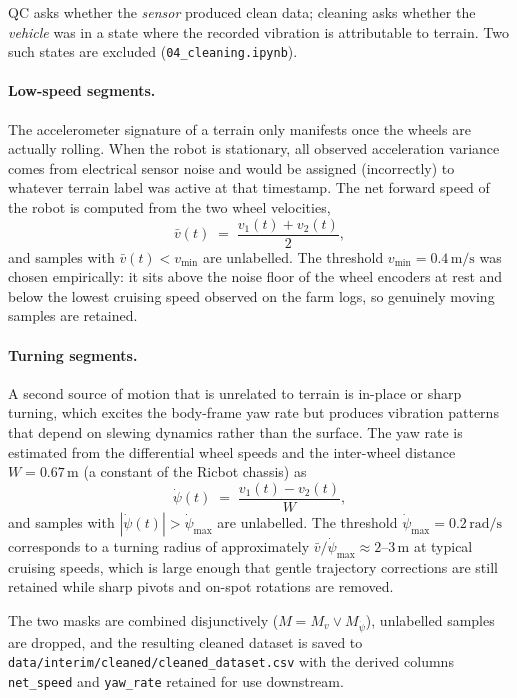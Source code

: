 QC asks whether the \emph{sensor} produced clean data; cleaning asks whether the \emph{vehicle} was in a state where the recorded vibration is attributable to terrain. Two such states are excluded (\texttt{04\_cleaning.ipynb}).

\paragraph{Low-speed segments.}
The accelerometer signature of a terrain only manifests once the wheels are actually rolling. When the robot is stationary, all observed acceleration variance comes from electrical sensor noise and would be assigned (incorrectly) to whatever terrain label was active at that timestamp. The net forward speed of the robot is computed from the two wheel velocities,
\begin{equation}
    \bar{v}(t) \;=\; \frac{v_1(t) + v_2(t)}{2},
    \label{eq:net_speed}
\end{equation}
and samples with $\bar{v}(t) < v_{\min}$ are unlabelled. The threshold $v_{\min} = 0.4\,\text{m/s}$ was chosen empirically: it sits above the noise floor of the wheel encoders at rest and below the lowest cruising speed observed on the farm logs, so genuinely moving samples are retained.

\paragraph{Turning segments.}
A second source of motion that is unrelated to terrain is in-place or sharp turning, which excites the body-frame yaw rate but produces vibration patterns that depend on slewing dynamics rather than the surface. The yaw rate is estimated from the differential wheel speeds and the inter-wheel distance $W = 0.67\,\text{m}$ (a constant of the Ricbot chassis) as
\begin{equation}
    \dot{\psi}(t) \;=\; \frac{v_1(t) - v_2(t)}{W},
    \label{eq:yaw_rate}
\end{equation}
and samples with $|\dot{\psi}(t)| > \dot{\psi}_{\max}$ are unlabelled. The threshold $\dot{\psi}_{\max} = 0.2\,\text{rad/s}$ corresponds to a turning radius of approximately $\bar{v}/\dot{\psi}_{\max} \approx 2$--$3\,\text{m}$ at typical cruising speeds, which is large enough that gentle trajectory corrections are still retained while sharp pivots and on-spot rotations are removed.

The two masks are combined disjunctively ($M = M_{v} \lor M_{\dot{\psi}}$), unlabelled samples are dropped, and the resulting cleaned dataset is saved to \texttt{data/interim/cleaned/cleaned\_\allowbreak dataset.csv} with the derived columns \texttt{net\_speed} and \texttt{yaw\_rate} retained for use downstream.

